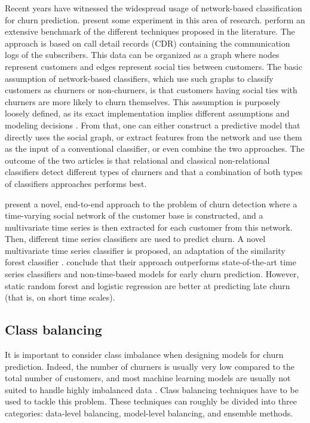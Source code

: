 Recent years have witnessed the widespread usage of network-based classification
for churn prediction. \textcite{verbeke2014social} present some experiment in
this area of research. \parencite{oskarsdottir2017social} perform an extensive
benchmark of the different techniques proposed in the literature. The approach
is based on call detail records (CDR) containing the communication logs of the
subscribers. This data can be organized as a graph where nodes represent
customers and edges represent social ties between customers. The basic
assumption of network-based classifiers, which use such graphs to classify
customers as churners or non-churners, is that customers having social ties with
churners are more likely to churn themselves. This assumption is purposely
loosely defined, as its exact implementation implies different assumptions and
modeling decisions \parencite{oskarsdottir2017social}. From that, one can either
construct a predictive model that directly uses the social graph, or extract
features from the network and use them as the input of a conventional
classifier, or even combine the two approaches. The outcome of the two articles
is that relational and classical non-relational classifiers detect different
types of churners and that a combination of both types of classifiers
approaches performs best.

\textcite{oskarsdottir2018time} present a novel, end-to-end approach to the
problem of churn detection where a time-varying social network of the customer
base is constructed, and a multivariate time series is then extracted for each
customer from this network. Then, different time series classifiers are used to
predict churn. A novel multivariate time series classifier is proposed, an
adaptation of the similarity forest classifier \parencite{sathe2017similarity}.
\textcite{oskarsdottir2018time} conclude that their approach outperforms
state-of-the-art time series classifiers and non-time-based models for early
churn prediction. However, static random forest and logistic regression are
better at predicting late churn (that is, on short time scales).

\subsection{Class balancing}
\label{sec:sota_balancing}

It is important to consider class imbalance when designing models for churn
prediction. Indeed, the number of churners is usually very low compared to the
total number of customers, and most machine learning models are usually not
suited to handle highly imbalanced data \parencite{batista2004study}. Class
balancing techniques have to be used to tackle this problem. These techniques
can roughly be divided into three categories: data-level balancing, model-level
balancing, and ensemble methods.

